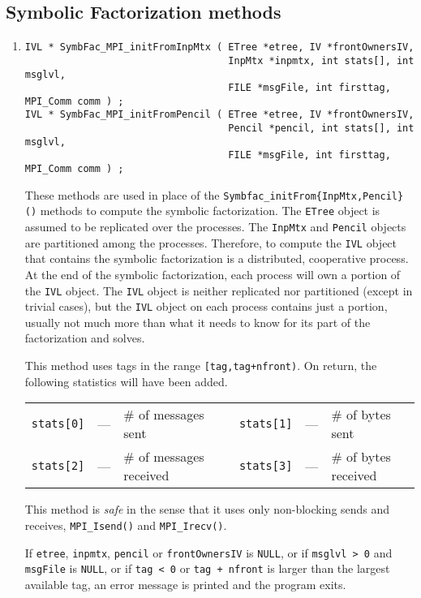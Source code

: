 \subsection{Symbolic Factorization methods}
\label{subsection:MPI:proto:symbfac}
\par
\begin{enumerate}
\item
\begin{verbatim}
IVL * SymbFac_MPI_initFromInpMtx ( ETree *etree, IV *frontOwnersIV, 
                                   InpMtx *inpmtx, int stats[], int msglvl, 
                                   FILE *msgFile, int firsttag, MPI_Comm comm ) ;
IVL * SymbFac_MPI_initFromPencil ( ETree *etree, IV *frontOwnersIV, 
                                   Pencil *pencil, int stats[], int msglvl, 
                                   FILE *msgFile, int firsttag, MPI_Comm comm ) ;
\end{verbatim}
These methods are used in place of 
the {\tt Symbfac\_initFrom\{InpMtx,Pencil\}()}
methods to compute the symbolic factorization.
The {\tt ETree} object is assumed to be replicated over the processes.
The {\tt InpMtx} and
{\tt Pencil} objects are partitioned among the processes.
Therefore, to compute the {\tt IVL} object that contains 
the symbolic factorization is a distributed, cooperative process.
At the end of the symbolic factorization, 
each process will own a portion of the {\tt IVL} object.
The {\tt IVL} object is neither replicated nor partitioned
(except in trivial cases), but the {\tt IVL} object on each process
contains just a portion, usually not much more than what it needs
to know for its part of the factorization and solves.
\par
This method uses tags in the range {\tt [tag,tag+nfront)}.
On return, the following statistics will have been added.
\begin{center}
\begin{tabular}{cclcccl}
{\tt stats[0]} & --- & \# of messages sent 
& &
{\tt stats[1]} & --- & \# of bytes sent \\
{\tt stats[2]} & --- & \# of messages received 
& &
{\tt stats[3]} & --- & \# of bytes received 
\end{tabular}
\end{center}
This method is {\it safe} in the sense that it uses only
non-blocking sends and receives, 
{\tt MPI\_Isend()} and {\tt MPI\_Irecv()}.
\par {}
If {\tt etree}, {\tt inpmtx}, {\tt pencil} 
or {\tt frontOwnersIV} is {\tt NULL}, 
or if {\tt msglvl > 0} and {\tt msgFile} is {\tt NULL},
or if {\tt tag < 0} or {\tt tag + nfront} 
is larger than the largest available tag,
an error message is printed and the program exits.
\end{enumerate}
\par
